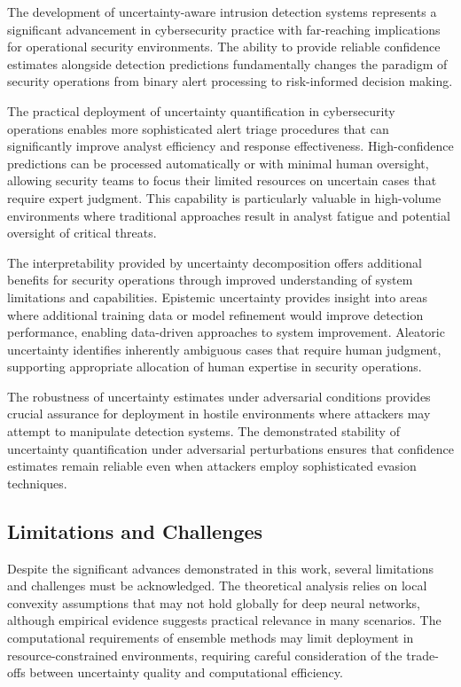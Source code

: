 \documentclass[journal]{IEEEtran}
\begin{document}
The development of uncertainty-aware intrusion detection systems represents a significant advancement in cybersecurity practice with far-reaching implications for operational security environments. The ability to provide reliable confidence estimates alongside detection predictions fundamentally changes the paradigm of security operations from binary alert processing to risk-informed decision making.

The practical deployment of uncertainty quantification in cybersecurity operations enables more sophisticated alert triage procedures that can significantly improve analyst efficiency and response effectiveness. High-confidence predictions can be processed automatically or with minimal human oversight, allowing security teams to focus their limited resources on uncertain cases that require expert judgment. This capability is particularly valuable in high-volume environments where traditional approaches result in analyst fatigue and potential oversight of critical threats.

The interpretability provided by uncertainty decomposition offers additional benefits for security operations through improved understanding of system limitations and capabilities. Epistemic uncertainty provides insight into areas where additional training data or model refinement would improve detection performance, enabling data-driven approaches to system improvement. Aleatoric uncertainty identifies inherently ambiguous cases that require human judgment, supporting appropriate allocation of human expertise in security operations.

The robustness of uncertainty estimates under adversarial conditions provides crucial assurance for deployment in hostile environments where attackers may attempt to manipulate detection systems. The demonstrated stability of uncertainty quantification under adversarial perturbations ensures that confidence estimates remain reliable even when attackers employ sophisticated evasion techniques.

\subsection{Limitations and Challenges}

Despite the significant advances demonstrated in this work, several limitations and challenges must be acknowledged. The theoretical analysis relies on local convexity assumptions that may not hold globally for deep neural networks, although empirical evidence suggests practical relevance in many scenarios. The computational requirements of ensemble methods may limit deployment in resource-constrained environments, requiring careful consideration of the trade-offs between uncertainty quality and computational efficiency.
\end{document}
